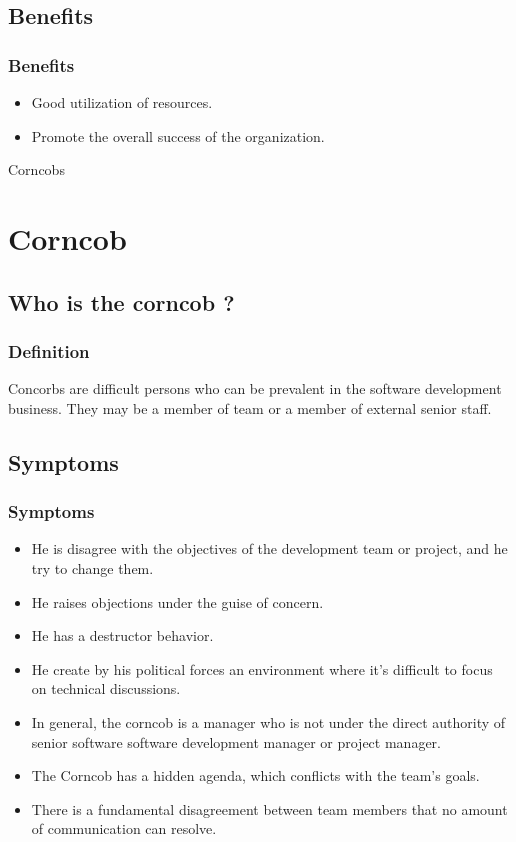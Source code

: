 \documentclass{beamer}
\begin{document}
\subsection{Benefits}
\begin{frame}
\frametitle{Benefits}
\begin{itemize}
\item Good utilization of resources.
\item Promote the overall success of the organization.
\end{itemize}
\end{frame}
\begin{center}
\begin{frame}
Corncobs
\end{frame}
\end{center}
\section{Corncob}
\subsection{Who is the corncob ?}
\begin{frame}
\frametitle{Definition}
Concorbs are difficult persons who can be prevalent in the software development business. They may be a member of team or a member of external senior staff.

\end{frame}

\subsection{Symptoms}
\begin{frame}
\frametitle{Symptoms}
\begin{itemize}
\item He is disagree with the objectives of the development team or project, and he try to change them.
\item He raises objections under the guise of concern.
\item He has a destructor behavior.
\item He create by his political forces an environment where it's difficult to focus on technical discussions.
\item In general, the corncob is a manager who is not under the direct authority of senior software software development manager or project manager.
\item The Corncob has a hidden agenda, which conflicts with the team's goals.
\item There is a fundamental disagreement between team members that no amount of communication can resolve.
\end{itemize}
\end{frame}
\end{document}
